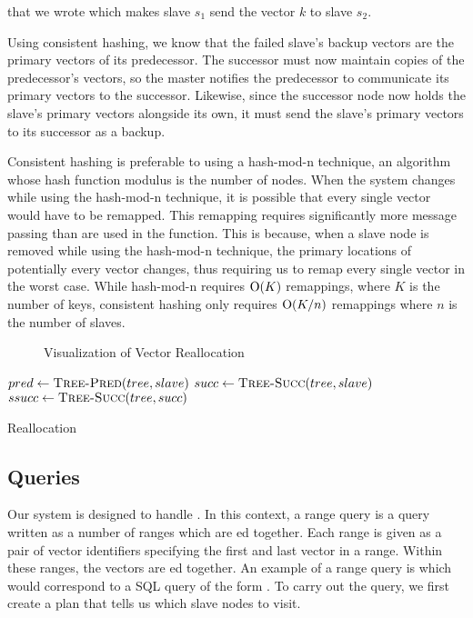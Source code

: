 that we wrote which makes slave \(s_1\) send the vector \(k\) to slave \(s_2\).
\par
Using consistent hashing, we know that the failed slave's backup vectors are
the primary vectors of its predecessor. The successor must now maintain copies
of the predecessor's vectors, so the master notifies the predecessor to
communicate its primary vectors to the successor. Likewise, since the successor
node now holds the slave's primary vectors alongside its own, it must send the
slave's primary vectors to its successor as a backup.
\par
Consistent hashing is preferable to using a hash-mod-n technique, an algorithm
whose hash function modulus is the number of nodes. When the system changes
while using the hash-mod-n technique, it is possible that every single vector
would have to be remapped. This remapping requires significantly more message
passing than are used in the  function. This is because,
when a slave node is removed while using the hash-mod-n technique, the primary
locations of potentially every vector changes, thus requiring us to remap every
single vector in the worst case. \cite{kleppman2017} While hash-mod-n requires
\(\mathrm{O}(K)\) remappings, where \(K\) is the number of keys, consistent
hashing only requires \(\mathrm{O}(K/n)\) remappings where \(n\) is the number of
slaves. \cite{karger1997}
%
\begin{figure}
    \centering
    
    \caption{Visualization of Vector Reallocation}
    \label{fig:vector-reallocation}
\end{figure}
%
\begin{algorithm}
    \begin{algorithmic}
            \State $pred \gets \Call{Tree-Pred}{tree, slave}$
            \State $succ \gets \Call{Tree-Succ}{tree, slave}$
            \State $ssucc \gets \Call{Tree-Succ}{tree, succ}$
                \State {}
            \EndFor
                \State {}
            \EndFor
            \State {}
        \EndProcedure
    \end{algorithmic}
    \caption{Reallocation}
    \label{alg:reallocate}
\end{algorithm}
%
\subsection{Queries}
Our system is designed to handle . In this context, a range
query is a query written as a number of ranges which are ed together.
Each range is given as a pair of vector identifiers specifying the first and
last vector in a range. Within these ranges, the vectors are ed
together. An example of a range query is  which would
correspond to a SQL query of the form
.
To carry out the query, we first create a plan that tells us which slave nodes
to visit.
%
